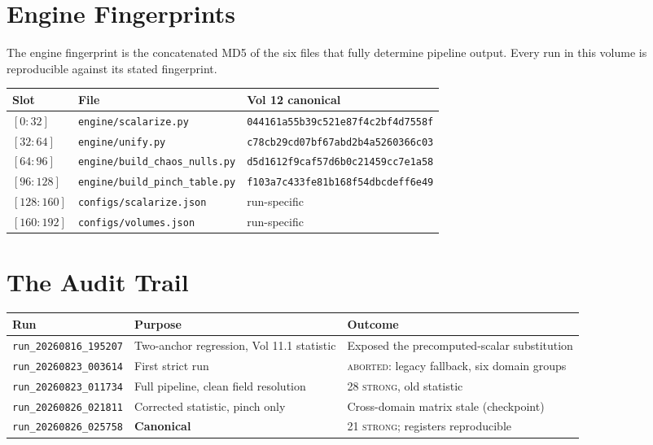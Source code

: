 \documentclass[11pt, letterpaper, openany]{book}
\begin{document}
\section{Engine Fingerprints}

The engine fingerprint is the concatenated MD5 of the six files that fully determine pipeline
output. Every run in this volume is reproducible against its stated fingerprint.

\begin{table}[H]
\centering
\footnotesize
\begin{tabular}{@{}llp{}@{}}
\toprule
\textbf{Slot} & \textbf{File} & \textbf{Vol 12 canonical} \\
\midrule
$[0{:}32]$ & \texttt{engine/scalarize.py} & \texttt{044161a55b39c521e87f4c2bf4d7558f} \\
$[32{:}64]$ & \texttt{engine/unify.py} & \texttt{c78cb29cd07bf67abd2b4a5260366c03} \\
$[64{:}96]$ & \texttt{engine/build\_chaos\_nulls.py} & \texttt{d5d1612f9caf57d6b0c21459cc7e1a58} \\
$[96{:}128]$ & \texttt{engine/build\_pinch\_table.py} & \texttt{f103a7c433fe81b168f54dbcdeff6e49} \\
$[128{:}160]$ & \texttt{configs/scalarize.json} & run-specific \\
$[160{:}192]$ & \texttt{configs/volumes.json} & run-specific \\
\bottomrule
\end{tabular}
\end{table}

\section{The Audit Trail}

\begin{table}[H]
\centering
\footnotesize
\begin{tabular}{@{}lll@{}}
\toprule
\textbf{Run} & \textbf{Purpose} & \textbf{Outcome} \\
\midrule
\texttt{run\_20260816\_195207} & Two-anchor regression, Vol 11.1 statistic & Exposed the precomputed-scalar substitution \\
\texttt{run\_20260823\_003614} & First strict run & \textsc{aborted}: legacy fallback, six domain groups \\
\texttt{run\_20260823\_011734} & Full pipeline, clean field resolution & 28 \textsc{strong}, old statistic \\
\texttt{run\_20260826\_021811} & Corrected statistic, pinch only & Cross-domain matrix stale (checkpoint) \\
\texttt{run\_20260826\_025758} & \textbf{Canonical} & 21 \textsc{strong}; registers reproducible \\
\bottomrule
\end{tabular}
\end{table}
\end{document}
